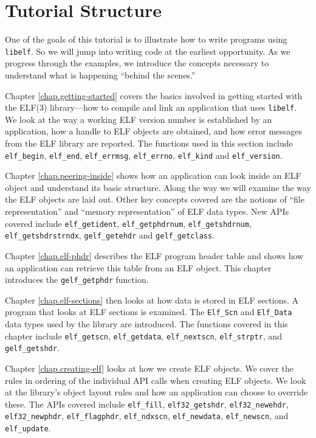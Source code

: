 \documentclass[a4paper,pdftex]{book}
\newcommand{\function}[1]{\texttt{#1}}
\newcommand{\library}[1]{\texttt{#1}}
\newcommand{\type}[1]{\texttt{#1}}
\begin{document}
\section{Tutorial Structure}

One of the goals of this tutorial is to illustrate how to write
programs using \library{libelf}.  So we will jump into writing code at
the earliest opportunity.  As we progress through the examples, we
introduce the concepts necessary to understand what is happening
``behind the scenes.''

Chapter \vref{chap.getting-started} covers the basics involved in
getting started with the ELF(3) library---how to compile and link an
application that uses \library{libelf}.  We look at the way a working
ELF version number is established by an application, how a handle to
ELF objects are obtained, and how error messages from the ELF library
are reported.  The functions used in this section include
\function{elf\_begin}, \function{elf\_end}, \function{elf\_errmsg},
\function{elf\_errno}, \function{elf\_kind} and
\function{elf\_version}.

Chapter \vref{chap.peering-inside} shows how an application can look
inside an ELF object and understand its basic structure.  Along the
way we will examine the way the ELF objects are laid out.  Other key
concepts covered are the notions of ``file representation'' and
``memory representation'' of ELF data types.  New APIs covered include
\function{elf\_getident}, \function{elf\_getphdrnum},
\function{elf\_getshdrnum}, \function{elf\_getshdrstrndx},
\function{gelf\_getehdr} and \function{gelf\_getclass}.

Chapter \vref{chap.elf-phdr} describes the ELF prog\-ram head\-er
table and shows how an appli\-cation can retrieve this table from an
ELF object.  This chapter introduces the \function{gelf\_getphdr}
function.

Chapter \vref{chap.elf-sections} then looks at how data is stored in
ELF sections.  A program that looks at ELF sections is examined.  The
\type{Elf\_Scn} and \type{Elf\_Data} data types used by the library
are introduced. The functions covered in this chapter include
\function{elf\_\-getscn}, \function{elf\_\-getdata},
\function{elf\_\-nextscn}, \function{elf\_\-strptr}, and
\function{gelf\_\-getshdr}.

Chapter \vref{chap.creating-elf} looks at how we create ELF objects.
We cover the rules in ordering of the individual API calls when
creating ELF objects.  We look at the library's object layout rules
and how an application can choose to override these.  The APIs covered
include \function{elf\_fill}, \function{elf32\_get\-shdr},
\function{elf32\_new\-ehdr}, \function{elf32\_new\-phdr},
\function{elf\_flag\-phdr}, \function{elf\_ndx\-scn},
\function{elf\_new\-data}, \function{elf\_new\-scn}, and
\function{elf\_update}.
\end{document}
